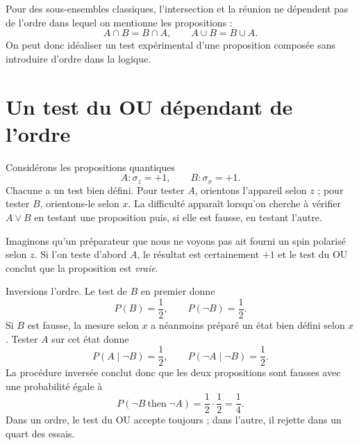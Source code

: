 \begin{classroomqa}
\end{classroomqa}

Pour des sous-ensembles classiques, l’intersection et la réunion ne dépendent pas de l’ordre dans lequel on mentionne les propositions :
\[
A\cap B=B\cap A,\qquad A\cup B=B\cup A.
\]
On peut donc idéaliser un test expérimental d’une proposition composée sans introduire d’ordre dans la logique.

\section{Un test du OU dépendant de l’ordre}

Considérons les propositions quantiques
\begin{equation}
A:\sigma_z=+1,\qquad B:\sigma_x=+1.
\end{equation}
Chacune a un test bien défini. Pour tester \(A\), orientons l’appareil selon \(z\) ; pour tester \(B\), orientons-le selon \(x\). La difficulté apparaît lorsqu’on cherche à vérifier \(A\lor B\) en testant une proposition puis, si elle est fausse, en testant l’autre.

Imaginons qu’un préparateur que nous ne voyons pas ait fourni un spin polarisé selon \(z\). Si l’on teste d’abord \(A\), le résultat est certainement \(+1\) et le test du OU conclut que la proposition est \emph{vraie}.

Inversions l’ordre. Le test de \(B\) en premier donne
\[
P(B)=\frac12,\qquad P(\neg B)=\frac12.
\]
Si \(B\) est fausse, la mesure selon \(x\) a néanmoins préparé un état bien défini selon \(x\). Tester \(A\) sur cet état donne
\[
P(A\mid \neg B)=\frac12,\qquad
P(\neg A\mid \neg B)=\frac12.
\]
La procédure inversée conclut donc que les deux propositions sont fausses avec une probabilité égale à
\begin{equation}
P(\neg B\ \text{then}\ \neg A)
=\frac12\cdot\frac12=\frac14.
\end{equation}
Dans un ordre, le test du OU accepte toujours ; dans l’autre, il rejette dans un quart des essais.

